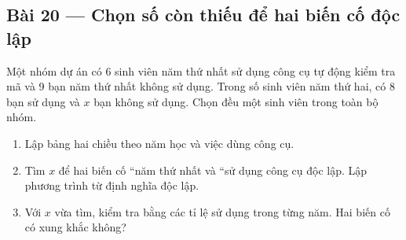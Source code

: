 \documentclass[11pt,a4paper]{article}
\begin{document}
\par\medskip

\noindent\begin{minipage}{\linewidth}
\subsection*{Bài 20 --- Chọn số còn thiếu để hai biến cố độc lập}

Một nhóm dự án có 6 sinh viên năm thứ nhất sử dụng công cụ tự động kiểm tra mã và 9 bạn năm thứ nhất không sử dụng. Trong số sinh viên năm thứ hai, có 8 bạn sử dụng và \(x\) bạn không sử dụng. Chọn đều một sinh viên trong toàn bộ nhóm.

\begin{enumerate}[label=\alph*)]
\item Lập bảng hai chiều theo năm học và việc dùng công cụ.
\item Tìm \(x\) để hai biến cố ``năm thứ nhất và ``sử dụng công cụ độc lập. Lập phương trình từ định nghĩa độc lập.
\item Với \(x\) vừa tìm, kiểm tra bằng các tỉ lệ sử dụng trong từng năm. Hai biến cố có xung khắc không?
\end{enumerate}

\end{minipage}\par

\par\medskip
\end{document}
